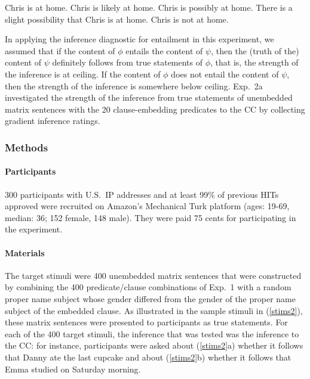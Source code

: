 \documentclass[11pt,fleqn]{article}
\newcommand{\6}{\mbox{$[\hspace*{-.6mm}[$}}
\newcommand{\9}{\mbox{$]\hspace*{-.6mm}]$}}
\begin{document}
\begin{exe}
\ex\label{chris}
\begin{xlist}
 Chris is at home.
 Chris is likely at home.
 Chris is possibly at home.
 There is a slight possibility that Chris is at home.
 Chris is not at home.
\end{xlist}
\end{exe}

In applying the inference diagnostic for entailment in this experiment, we assumed that if the content of $\phi$ entails the content of $\psi$, then the (truth of the) content of $\psi$ definitely follows from true statements of $\phi$, that is, the strength of the inference is at ceiling. If the content of $\phi$ does not entail the content of $\psi$, then the strength of the inference is somewhere below ceiling. Exp.~2a investigated the strength of the inference from true statements of unembedded matrix sentences with the 20 clause-embedding predicates to the CC by collecting gradient inference ratings.

\subsubsection{Methods}

\paragraph{Participants} 300 participants with U.S.\ IP addresses and at least 99\% of previous HITs approved were recruited on Amazon's Mechanical Turk platform (ages: 19-69, median: 36; 152 female, 148 male). They were paid 75 cents for participating in the experiment.

\paragraph{Materials} The target stimuli were 400 unembedded matrix sentences that were constructed by combining the 400 predicate/clause combinations of Exp.~1 with a random proper name subject whose gender differed from the gender of the proper name subject of the embedded clause. As illustrated in the sample stimuli in (\ref{stims2}), these matrix sentences were presented to participants as true statements. For each of the 400 target stimuli, the inference that was tested was the inference to the CC: for instance, participants were asked about (\ref{stims2}a) whether it follows that Danny ate the last cupcake and about (\ref{stims2}b) whether it follows that Emma studied on Saturday morning.
\end{document}
